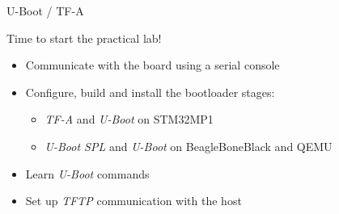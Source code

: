 \setuplabframe
{U-Boot / TF-A}
{
  Time to start the practical lab!
  \begin{itemize}
  \item Communicate with the board using a serial console
  \item Configure, build and install the bootloader stages:
        \begin{itemize}
		\item {\em TF-A} and {\em U-Boot} on STM32MP1
		\item {\em U-Boot SPL} and {\em U-Boot} on BeagleBoneBlack and QEMU
	\end{itemize}
  \item Learn {\em U-Boot} commands
  \item Set up {\em TFTP} communication with the host
  \end{itemize}
}
